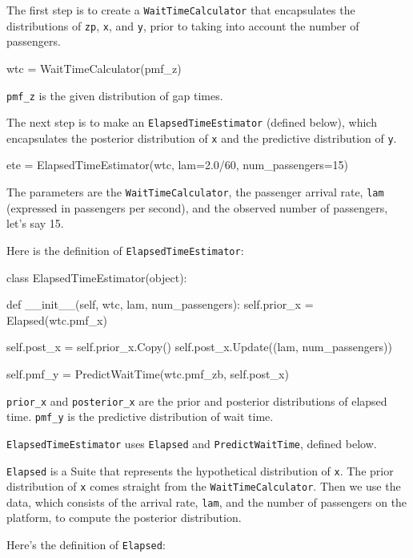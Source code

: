 \documentclass[12pt]{book}
\theoremstyle{exercise}
\begin{document}
The first step is to create a {\tt WaitTimeCalculator} that
encapsulates the distributions of {\tt zp}, {\tt x},
and {\tt y}, prior to taking into account the number of
passengers.

\begin{code}
    wtc = WaitTimeCalculator(pmf_z)
\end{code}

\verb"pmf_z" is the given distribution of gap times.

The next step is to make an {\tt ElapsedTimeEstimator} (defined
below), which encapsulates the posterior distribution of {\tt x} and
the predictive distribution of {\tt y}.

\begin{code}
    ete = ElapsedTimeEstimator(wtc,
                               lam=2.0/60,
                               num_passengers=15)
\end{code}

The parameters are the {\tt WaitTimeCalculator}, the passenger
arrival rate, {\tt lam} (expressed in passengers per second),
and the observed number of passengers, let's say 15.

Here is the definition of {\tt ElapsedTimeEstimator}:

\begin{code}
class ElapsedTimeEstimator(object):

    def __init__(self, wtc, lam, num_passengers):
        self.prior_x = Elapsed(wtc.pmf_x)

        self.post_x = self.prior_x.Copy()
        self.post_x.Update((lam, num_passengers))

        self.pmf_y = PredictWaitTime(wtc.pmf_zb, self.post_x)
\end{code}

\verb"prior_x" and \verb"posterior_x" are the prior and
posterior distributions of elapsed time.  \verb"pmf_y" is
the predictive distribution of wait time.

{\tt ElapsedTimeEstimator} uses {\tt Elapsed} and {\tt PredictWaitTime},
defined below.

{\tt Elapsed} is a Suite that represents the hypothetical
distribution of {\tt x}.  The prior distribution of {\tt x}
comes straight from the {\tt WaitTimeCalculator}.  Then we
use the data, which consists of the arrival rate, {\tt lam},
and the number of passengers on the platform, to compute
the posterior distribution.

Here's the definition of {\tt Elapsed}:
\end{document}
